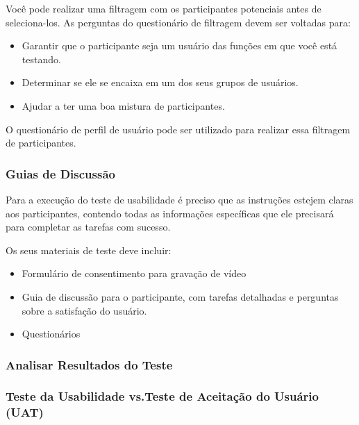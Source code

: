 Você pode realizar uma filtragem com os participantes potenciais antes de seleciona-los. As perguntas do questionário de filtragem devem ser voltadas para:

\begin{itemize}
\item Garantir que o participante seja um usuário das funções em que você está testando.
\item Determinar se ele se encaixa em um dos seus grupos de usuários.
\item Ajudar a ter uma boa mistura de participantes.
\end{itemize}

O questionário de perfil de usuário pode ser utilizado para realizar essa filtragem de participantes.

\subsubsection{Guias de Discussão}

Para a execução do teste de usabilidade é preciso que as instruções estejem claras aos participantes, contendo todas as informações específicas que ele precisará para completar as tarefas com sucesso.

Os seus materiais de teste deve incluir:

\begin{itemize}
\item Formulário de consentimento para gravação de vídeo
\item Guia de discussão para o participante, com tarefas detalhadas e perguntas sobre a satisfação do usuário.
\item Questionários
\end{itemize}


\subsubsection{Analisar Resultados do Teste}


\subsubsection{Teste da Usabilidade vs.Teste de Aceitação do Usuário (UAT)}




